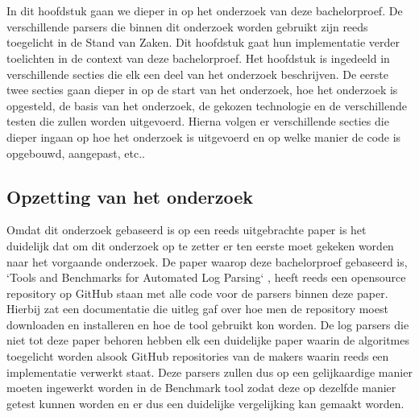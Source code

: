 
\chapter{}
\label{ch:methodologie}


In dit hoofdstuk gaan we dieper in op het onderzoek van deze bachelorproef. De verschillende parsers die binnen dit onderzoek worden gebruikt zijn reeds toegelicht in de Stand van Zaken. Dit hoofdstuk gaat hun implementatie verder toelichten in de context van deze bachelorproef. Het hoofdstuk is ingedeeld in verschillende secties die elk een deel van het onderzoek beschrijven. De eerste twee secties gaan dieper in op de start van het onderzoek, hoe het onderzoek is opgesteld, de basis van het onderzoek, de gekozen technologie en de verschillende testen die zullen worden uitgevoerd. Hierna volgen er verschillende secties die dieper ingaan op hoe het onderzoek is uitgevoerd en op welke manier de code is opgebouwd, aangepast, etc..


\section{Opzetting van het onderzoek}
Omdat dit onderzoek gebaseerd is op een reeds uitgebrachte paper is het duidelijk dat om dit onderzoek op te zetter er ten eerste moet gekeken worden naar het vorgaande onderzoek. De paper waarop deze bachelorproef gebaseerd is, `Tools and Benchmarks for Automated Log Parsing` \autocite{TBA2019}, heeft reeds een opensource repository op GitHub staan met alle code voor de parsers binnen deze paper. Hierbij zat een documentatie die uitleg gaf over hoe men de repository moest downloaden en installeren en hoe de tool gebruikt kon worden. De log parsers die niet tot deze paper behoren hebben elk een duidelijke paper waarin de algoritmes toegelicht worden alsook GitHub repositories van de makers waarin reeds een implementatie verwerkt staat. Deze parsers zullen dus op een gelijkaardige manier moeten ingewerkt worden in de Benchmark tool zodat deze op dezelfde manier getest kunnen worden en er dus een duidelijke vergelijking kan gemaakt worden.\\

